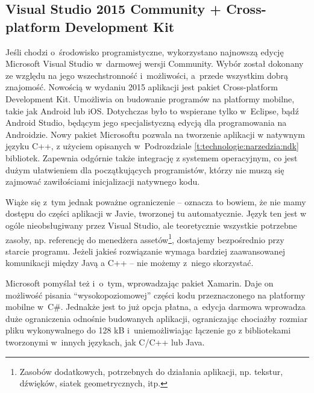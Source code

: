 		\subsection{Visual Studio 2015 Community + Cross-platform Development Kit}
		\label{t:technologie:narzedzia:vs}
		
		
		Jeśli chodzi o~środowisko programistyczne, wykorzystano najnowszą edycję Microsoft Visual Studio w~darmowej wersji Community. Wybór został dokonany ze względu na jego wszechstronność i~możliwości, a~przede wszystkim dobrą znajomość. Nowością w wydaniu 2015 aplikacji jest pakiet Cross-platform Development Kit. Umożliwia on budowanie programów na platformy mobilne, takie jak Android lub iOS. Dotychczas było to wspierane tylko w~Eclipse, bądź Android Studio, będącym jego specjalistyczną edycją dla programowania na Androidzie. Nowy pakiet Microsoftu pozwala na tworzenie aplikacji w natywnym języku C++, z użyciem opisanych w~Podrozdziale \ref{t:technologie:narzedzia:ndk} bibliotek. Zapewnia odgórnie także integrację z systemem operacyjnym, co jest dużym ułatwieniem dla początkujących programistów, którzy nie muszą się zajmować zawiłościami inicjalizacji natywnego kodu. 
		
		Wiąże się z~tym jednak poważne ograniczenie -- oznacza to bowiem, że nie mamy dostępu do części aplikacji w Javie, tworzonej tu automatycznie. Język ten jest w ogóle nieobsługiwany przez Visual Studio, ale teoretycznie wszystkie potrzebne zasoby, np. referencję do menedżera assetów\footnote{Zasobów dodatkowych, potrzebnych do działania aplikacji, np. tekstur, dźwięków, siatek geometrycznych, itp.}, dostajemy bezpośrednio przy starcie programu. Jeżeli jakieś rozwiązanie wymaga bardziej zaawansowanej komunikacji między Javą a C++ -- nie możemy z~niego skorzystać.
		
		Microsoft pomyślał też i~o~tym, wprowadzając pakiet Xamarin. Daje on możliwość pisania ``wysokopoziomowej'' części kodu przeznaczonego na platformy mobilne w~C\#. Jednakże jest to już opcja płatna, a~edycja darmowa wprowadza duże ograniczenia odnośnie budowanych aplikacji, ograniczając chociażby rozmiar pliku wykonywalnego do 128 kB i~uniemożliwiając łączenie go z bibliotekami tworzonymi w~innych językach, jak C/C++ lub Java.
		
